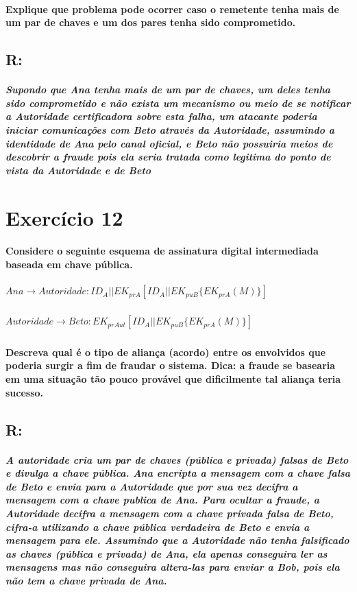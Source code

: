 \documentclass[10pt,a4paper]{report}
\begin{document}
\paragraph{Explique que problema pode ocorrer caso o remetente tenha mais de um par de chaves e um dos pares tenha sido comprometido.}
\subsection*{R:}
\subparagraph{Supondo que Ana tenha mais de um par de chaves, um deles tenha sido comprometido e não exista um mecanismo ou meio de se notificar a Autoridade certificadora sobre esta falha, um atacante poderia iniciar comunicações com Beto através da Autoridade, assumindo a identidade de Ana pelo canal oficial, e Beto não possuiria meios de descobrir a fraude pois ela seria tratada como legitima do ponto de vista da Autoridade e de Beto}

\section*{Exercício 12}
\paragraph{Considere o seguinte esquema de assinatura digital intermediada baseada em chave pública.} 
\subparagraph{$Ana \rightarrow Autoridade: ID_A || EK_{prA} [ ID_A || EK_{puB} \{ EK_{prA} ( M ) \} ]$}
\subparagraph{$Autoridade \rightarrow Beto:  EK_{prAut} [ ID_A || EK_{puB} \{ EK_{prA} ( M ) \} ]$}
\paragraph{Descreva qual é o tipo de aliança (acordo) entre os envolvidos que poderia surgir a fim de fraudar o sistema. Dica: a fraude se basearia em uma situação tão pouco provável que dificilmente tal aliança teria sucesso.}
\subsection*{R:}
\subparagraph{A autoridade cria um par de chaves (pública e privada) falsas de Beto e divulga a chave pública.
Ana encripta a mensagem com a chave falsa de Beto  e envia para a Autoridade que por sua vez decifra a mensagem com a chave publica de Ana.  Para ocultar a fraude, a Autoridade decifra a mensagem com a chave privada falsa de Beto, cifra-a utilizando a chave pública verdadeira de Beto e envia a mensagem para ele. Assumindo que a Autoridade não tenha falsificado as chaves (pública e privada) de Ana, ela apenas conseguira ler as mensagens mas não conseguira altera-las para enviar a Bob, pois ela não tem a chave privada de Ana.}
\end{document}
